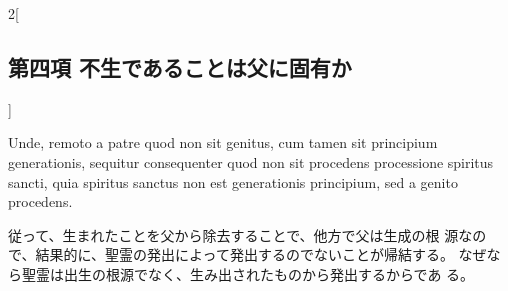\documentclass[paper=a4paper,fontsize=10pt,jafontsize=9pt,titlepage]{jlreq}
\begin{document}
\begin{paracol}{2}[\subsection{第四項 不生であることは父に固有か}]
\switchcolumn*


Unde, remoto a patre
quod non sit genitus, cum tamen sit principium generationis, sequitur
consequenter quod non sit procedens processione spiritus sancti, quia
spiritus sanctus non est generationis principium, sed a genito
procedens.


\switchcolumn


従って、生まれたことを父から除去することで、他方で父は生成の根
 源なので、結果的に、聖霊の発出によって発出するのでないことが帰結する。
 なぜなら聖霊は出生の根源でなく、生み出されたものから発出するからであ
 る。


\switchcolumn*



\end{paracol}
\newpage
\end{document}
